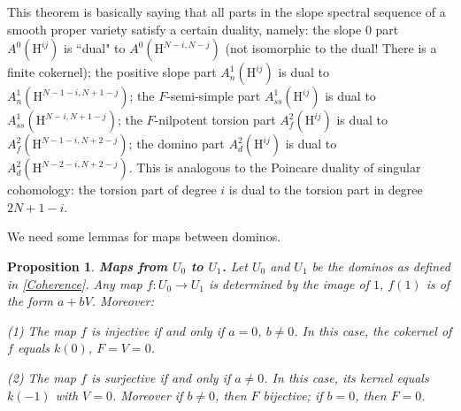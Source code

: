 \documentclass[a4paper,12pt,twoside]{report}
\newtheorem{proposition}[theorem]{Proposition}
\newtheorem{corollary}[theorem]{Corollary}
\newcommand{\HH}{\mathrm{H}}
\begin{document}
This theorem is basically saying that all parts in the slope spectral sequence of a smooth proper variety satisfy a
certain duality, namely: the slope $0$ part $A^0(\HH^{ij})$ is ``dual" to $A^0(\HH^{N-i,N-j})$ 
(not isomorphic to the dual! There is a finite cokernel); 
the positive slope part $A^1_n(\HH^{ij})$ is dual to $A^1_n(\HH^{N-1-i,N+1-j})$; 
the $F$-semi-simple part $A^1_{ss}(\HH^{ij})$ is dual to $A^1_{ss}(\HH^{N-i,N+1-j})$; 
the $F$-nilpotent torsion part $A^2_{f}(\HH^{ij})$ is dual to $A^2_f(\HH^{N-1-i,N+2-j})$;
the domino part $A^2_d(\HH^{ij})$ is dual to $A^2_{d}(\HH^{N-2-i,N+2-j})$. 
This is analogous to the Poincare duality of singular cohomology: 
the torsion part of degree $i$ is dual to the torsion part in degree $2N+1-i$. 

\medskip



    

We need some lemmas for maps between dominos. 

\begin{proposition}{\bf Maps from $U_0$ to $U_1$.}
    Let $U_0$ and $U_1$ be the dominos as defined in \ref{Coherence}. 
    Any map $f:U_0\rightarrow U_1$ is determined by the image of $1$, $f(1)$ is of the form $a+bV$. Moreover: 

    {\rm (1)} The map $f$ is injective if and only if  $a=0$, $b\neq 0$. 
    In this case, the cokernel of $f$ equals $k(0)$, $F=V=0$. 

    {\rm (2)} The map $f$ is surjective if and only if $a\neq 0$. 
    In this case, its kernel equals $k(-1)$ with $V=0$. 
    Moreover if $b\neq 0$, then $F$ bijective;
    if $b=0$, then $F=0$. 
\end{proposition}
\end{document}
